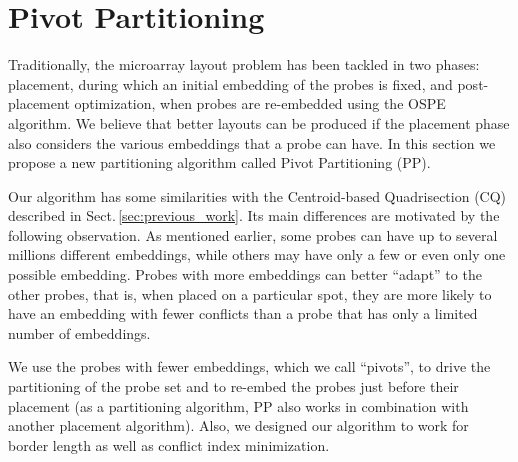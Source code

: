 \documentclass{llncs}
\begin{document}
\section{Pivot Partitioning}
\label{sec:pivotpart}

Traditionally, the microarray layout problem has been tackled in two phases:
placement, during which an initial embedding of the probes is fixed, and
post-placement optimization, when probes are re-embedded using the OSPE algorithm.
We believe that better layouts can be produced if the placement phase also considers
the various embeddings that a probe can have. In this section we propose a new
partitioning algorithm called Pivot Partitioning (PP).

Our algorithm
has some similarities with the Centroid-based Quadrisection (CQ) described
in Sect.\,\ref{sec:previous_work}.
Its main differences are motivated by the following observation.
As mentioned earlier, some probes can have up to several millions different
embeddings, while others may have only a few or even only one possible embedding.
Probes with more embeddings can better
``adapt'' to the other probes, that is, when placed on a particular spot, they are more likely
to have an embedding with fewer conflicts than a probe that has
only a limited number of embeddings.

We use the probes with fewer embeddings, which we call ``pivots'', to drive the
partitioning of the probe set and to re-embed the probes just before their
placement (as a partitioning algorithm, PP also works in combination with
another placement algorithm). Also, we designed our algorithm to work for border
length as well as conflict index minimization.
\end{document}
